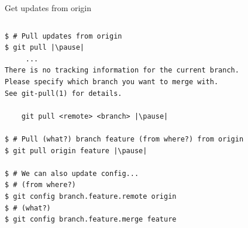\begin{frame}[fragile]{Get updates from origin}
\begin{columns}
	\begin{column}{0.6\textwidth}
	\begin{lstlisting}
$ # Pull updates from origin
$ git pull |\pause|
     ...
There is no tracking information for the current branch.
Please specify which branch you want to merge with.
See git-pull(1) for details.

    git pull <remote> <branch> |\pause|
    
$ # Pull (what?) branch feature (from where?) from origin
$ git pull origin feature |\pause|

$ # We can also update config...
$ # (from where?)
$ git config branch.feature.remote origin
$ # (what?)
$ git config branch.feature.merge feature


\end{lstlisting}
\end{column}
\end{columns}
\end{frame}

